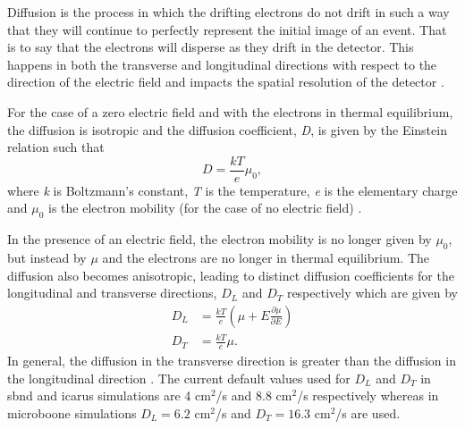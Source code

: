 Diffusion is the process in which the drifting electrons do not drift in such a way that they will continue to perfectly represent the initial image of an event. That is to say that the electrons will disperse as they drift in the detector. This happens in both the transverse and longitudinal directions with respect to the direction of the electric field and impacts the spatial resolution of the detector \cite{LArTPC_book}. 

For the case of a zero electric field and with the electrons in thermal equilibrium, the diffusion is isotropic and the diffusion coefficient, \textit{D}, is given by the Einstein relation such that
\begin{equation}
    D = \frac{kT}{e}\mu_0,
\end{equation}
where \textit{k} is Boltzmann's constant, \textit{T} is the temperature, \textit{e} is the elementary charge and $\mu_0$ is the electron mobility (for the case of no electric field) \cite{LArTPC_book}.

In the presence of an electric field, the electron mobility is no longer given by $\mu_0$, but instead by $\mu$ and the electrons are no longer in thermal equilibrium. The diffusion also becomes anisotropic, leading to distinct diffusion coefficients for the longitudinal and transverse directions, $D_L$ and $D_T$ respectively which are given by
\begin{equation}
\begin{split}
    D_L &= \frac{kT}{e}(\mu + E \frac{\partial \mu}{\partial E}) \\
    D_T &= \frac{kT}{e}\mu.
\end{split}
\end{equation}
In general, the diffusion in the transverse direction is greater than the diffusion in the longitudinal direction \cite{LArTPC_book} \cite{diffusion}. The current default values used for $D_L$ and $D_T$ in \gls{sbnd} and \gls{icarus} simulations are 4 cm$^2$/s and 8.8 cm$^2$/s respectively whereas in \gls{microboone} simulations $D_L = 6.2$ cm$^2$/s and $D_T = 16.3$ cm$^2$/s are used.

